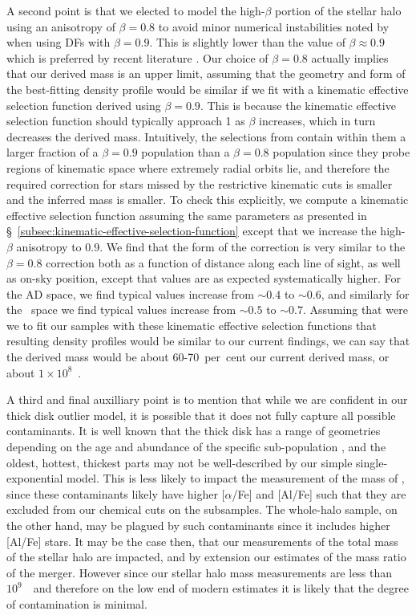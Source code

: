 A second point is that we elected to model the high-$\beta$ portion of the stellar halo using an anisotropy of $\beta=0.8$ to avoid minor numerical instabilities noted by \cite{lane22} when using DFs with $\beta=0.9$. This is slightly lower than the value of $\beta \approx 0.9$ which is preferred by recent literature \parencite{belokurov18,fattahi19,lancaster19,iorio21}. Our choice of $\beta=0.8$ actually implies that our derived mass is an upper limit, assuming that the geometry and form of the best-fitting \gse density profile would be similar if we fit with a kinematic effective selection function derived using $\beta=0.9$. This is because the kinematic effective selection function should typically approach 1 as $\beta$ increases, which in turn decreases the derived mass. Intuitively, the selections from \cite{lane22} contain within them a larger fraction of a $\beta=0.9$ population than a $\beta=0.8$ population since they probe regions of kinematic space where extremely radial orbits lie, and therefore the required correction for stars missed by the restrictive kinematic cuts is smaller and the inferred mass is smaller. To check this explicitly, we compute a kinematic effective selection function assuming the same parameters as presented in \S~\ref{subsec:kinematic-effective-selection-function} except that we increase the high-$\beta$ anisotropy to 0.9. We find that the form of the correction is very similar to the $\beta=0.8$ correction both as a function of distance along each line of sight, as well as on-sky position, except that values are as expected systematically higher. For the AD space, we find typical values increase from $\sim 0.4$ to $\sim 0.6$, and similarly for the \eLz\ space we find typical values increase from $\sim 0.5$ to $\sim 0.7$. Assuming that were we to fit our samples with these kinematic effective selection functions that resulting density profiles would be similar to our current findings, we can say that the derived mass would be about 60-70~per~cent our current derived mass, or about $1\times10^{8}$~\Msun.

A third and final auxilliary point is to mention that while we are confident in our thick disk outlier model, it is possible that it does not fully capture all possible contaminants. It is well known that the thick disk has a range of geometries depending on the age and abundance of the specific sub-population \parencite{bovy12,mackereth19b}, and the oldest, hottest, thickest parts may not be well-described by our simple single-exponential model. This is less likely to impact the measurement of the mass of \gse, since these contaminants likely have higher [$\alpha$/Fe] and [Al/Fe] such that they are excluded from our chemical cuts on the \gse subsamples. The whole-halo sample, on the other hand, may be plagued by such contaminants since it includes higher [Al/Fe] stars. It may be the case then, that our measurements of the total mass of the stellar halo are impacted, and by extension our estimates of the mass ratio of the \gse merger. However since our stellar halo mass measurements are less than $10^{9}$~\Msun\ and therefore on the low end of modern estimates \parencite[e.g.][]{deason19,mackereth20} it is likely that the degree of contamination is minimal.

